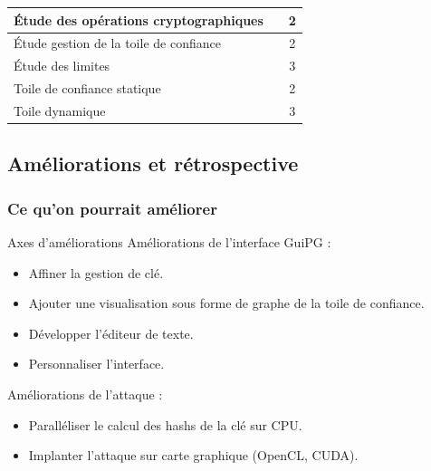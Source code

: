 \begin{frame}
\begin{tabular}{|l|l|l|}
    \hline
    \cellcolor{white}\color{red}\'{E}tude des opérations cryptographiques & \multicolumn{1}{|c|}{\cellcolor{white}\color{black}} & \multicolumn{1}{|c|}{\cellcolor{white}\color{black}2} \\
    \hline
    \cellcolor{white}\color{red}\'{E}tude gestion de la toile de confiance & \multicolumn{1}{|c|}{\cellcolor{white}\color{black}} & \multicolumn{1}{|c|}{\cellcolor{white}\color{black}2} \\
    \hline
    \cellcolor{white}\color{red}\'{E}tude des limites & \multicolumn{1}{|c|}{\cellcolor{white}\color{black}} & \multicolumn{1}{|c|}{\cellcolor{white}\color{black}3} \\
    \hline
    \cellcolor{white}\color{red}Toile de confiance statique & \multicolumn{1}{|c|}{\cellcolor{white}\color{black}} & \multicolumn{1}{|c|}{\cellcolor{white}\color{black}2} \\
    \hline
    \cellcolor{white}\color{red}Toile dynamique & \multicolumn{1}{|c|}{\cellcolor{white}\color{black}} & \multicolumn{1}{|c|}{\cellcolor{white}\color{black}3} \\
    \hline
  \end{tabular}
\end{frame}

\subsection{Améliorations et rétrospective}
  \begin{frame}
    \frametitle{\color{white}Ce qu'on pourrait améliorer}
    \begin{block}{Axes d'améliorations}
      Améliorations de l'interface GuiPG :
      \begin{itemize}
        \item Affiner la gestion de clé.
        \item Ajouter une visualisation sous forme de graphe de la toile de confiance.
        \item Développer l'éditeur de texte.
        \item Personnaliser l'interface.
      \end{itemize}
      Améliorations de l'attaque :
      \begin{itemize}
        \item Paralléliser le calcul des hashs de la clé sur CPU.
        \item Implanter l'attaque sur carte graphique (OpenCL, CUDA).
      \end{itemize}
    \end{block}
    
  \end{frame}

